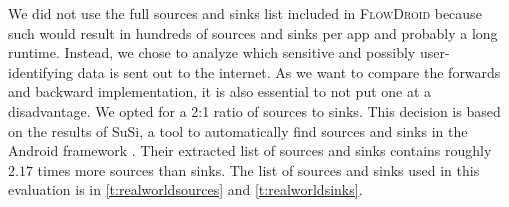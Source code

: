 \documentclass[../draft.tex]{subfiles}
\begin{document}
    We did not use the full sources and sinks list included in \textsc{FlowDroid} because such would result in hundreds of sources and sinks per app and probably a long runtime.
    Instead, we chose to analyze which sensitive and possibly user-identifying data is sent out to the internet.
    As we want to compare the forwards and backward implementation, it is also essential to not put one at a disadvantage.
    We opted for a 2:1 ratio of sources to sinks.
    This decision is based on the results of SuSi, a tool to automatically find sources and sinks in the Android framework \cite{Rasthofer2014}.
    Their extracted list of sources and sinks contains roughly $2.17$ times more sources than sinks.
    The list of sources and sinks used in this evaluation is in \autoref{t:realworldsources} and \autoref{t:realworldsinks}.
\end{document}
